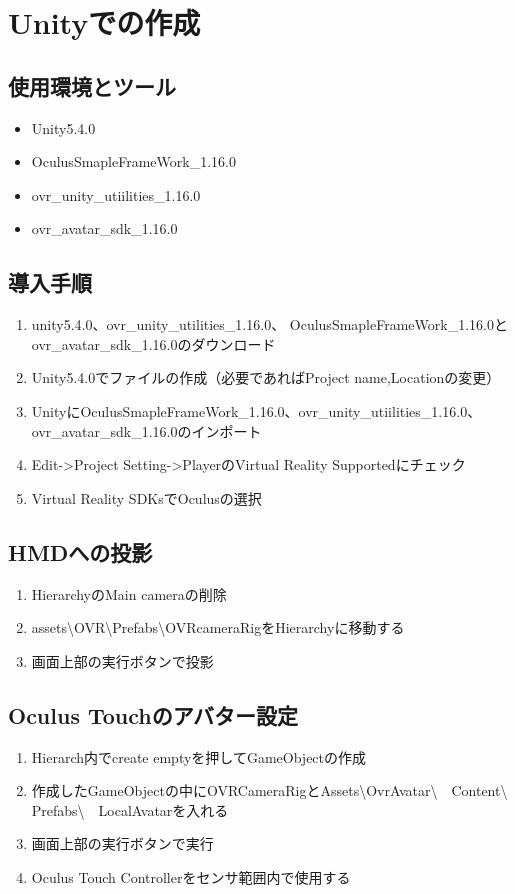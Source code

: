 \documentclass{jsarticle}
\begin{document}
\section{Unityでの作成}
\subsection{使用環境とツール}
\begin{itemize}
  \item Unity5.4.0
  \item OculusSmapleFrameWork\_1.16.0
  \item ovr\_unity\_utiilities\_1.16.0
  \item ovr\_avatar\_sdk\_1.16.0
\end{itemize}





\subsection{導入手順}
\begin{enumerate}
  \item unity5.4.0、ovr\_unity\_utilities\_1.16.0、
        OculusSmapleFrameWork\_1.16.0とovr\_avatar\_sdk\_1.16.0のダウンロード
  \item Unity5.4.0でファイルの作成（必要であればProject name,Locationの変更）
  \item UnityにOculusSmapleFrameWork\_1.16.0、ovr\_unity\_utiilities\_1.16.0、ovr\_avatar\_sdk\_1.16.0のインポート
  \item Edit->Project Setting->PlayerのVirtual Reality Supportedにチェック
  \item Virtual Reality SDKsでOculusの選択
\end{enumerate}

\subsection{HMDへの投影}
\begin{enumerate}
  \item HierarchyのMain cameraの削除
  \item assets\textbackslash OVR\textbackslash Prefabs\textbackslash OVRcameraRigをHierarchyに移動する
  \item 画面上部の実行ボタンで投影
\end{enumerate}


\subsection{Oculus Touchのアバター設定}
\begin{enumerate}
  \item Hierarch内でcreate emptyを押してGameObjectの作成
  \item 作成したGameObjectの中にOVRCameraRigとAssets\textbackslash OvrAvatar\textbackslash　Content\textbackslash　Prefabs\textbackslash　LocalAvatarを入れる
  \item 画面上部の実行ボタンで実行
  \item Oculus Touch Controllerをセンサ範囲内で使用する
\end{enumerate}
\end{document}
